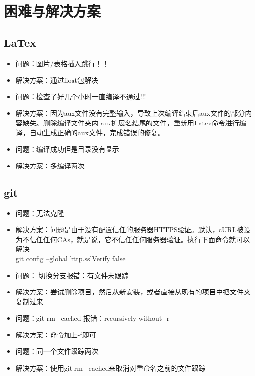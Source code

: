 \documentclass[UTF8]{ctexart}
\begin{document}
  \section{困难与解决方案}
  \subsection{LaTex}








\begin{itemize}
\item 问题：图片/表格插入跳行！！
\item 解决方案：通过float包解决

\item 问题：检查了好几个小时一直编译不通过!!!
\item 解决方案：因为aux文件没有完整输入，导致上次编译结束后aux文件的部分内容缺失。删除编译文件夹内.aux扩展名结尾的文件，重新用Latex命令进行编译，自动生成正确的aux文件，完成错误的修复。

\item 问题：编译成功但是目录没有显示
\item 解决方案：多编译两次
 \end{itemize}


\subsection{git}

\begin{itemize}
\item 问题：无法克隆
\item 解决方案：问题是由于没有配置信任的服务器HTTPS验证。默认，cURL被设为不信任任何CAs，就是说，它不信任任何服务器验证。执行下面命令就可以解决\\
git config --global http.sslVerify false


\item 问题： 切换分支报错：有文件未跟踪
\item 解决方案：尝试删除项目，然后从新安装，或者直接从现有的项目中把文件夹复制过来

\item 问题：git rm --cached 报错：recursively without -r
\item 解决方案：命令加上-f即可

\item 问题：同一个文件跟踪两次
\item 解决方案：使用git rm --cached来取消对重命名之前的文件跟踪
 \end{itemize}
\end{document}
